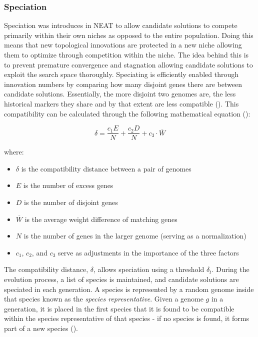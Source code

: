 \subsubsection{Speciation}
Speciation was introduces in NEAT to allow candidate solutions to compete primarily within their own niches as opposed to the entire population. Doing this means that new topological innovations are protected in a new niche allowing them to optimize through competition within the niche. The idea behind this is to prevent premature convergence and stagnation allowing candidate solutions to exploit the search space thoroughly. Speciating is efficiently enabled through innovation numbers by comparing how many disjoint genes there are between candidate solutions. Essentially, the more disjoint two genomes are, the less historical markers they share and by that extent are less compatible (\cite{stanley2002evolving}). This compatibility can be calculated through the following mathematical equation (\cite{stanley2002evolving}):

\begin{equation}\label{alg:speciation}
    \delta = \frac{c_1E}{N} + \frac{c_2D}{N} + c_3\cdot{\overline{W}}
\end{equation}

\noindent where:
\begin{itemize}
    \item $\delta$ is the compatibility distance between a pair of genomes
    \item $E$ is the number of excess genes
    \item $D$ is the number of disjoint genes
    \item $\overline{W}$ is the average weight difference of matching genes
    \item $N$ is the number of genes in the larger genome (serving as a normalization)
    \item $c_1$, $c_2$, and $c_3$ serve as adjustments in the importance of the three factors
\end{itemize}

\noindent The compatibility distance, $\delta$, allows speciation using a threshold $\delta_t$. During the evolution process, a list of species is maintained, and candidate solutions are speciated in each generation. A species is represented by a random genome inside that species known as the \textit{species representative}. Given a genome $g$ in a generation, it is placed in the first species that it is found to be compatible within the species representative of that species - if no species is found, it forms part of a new species (\cite{stanley2002evolving}). \bigskip

